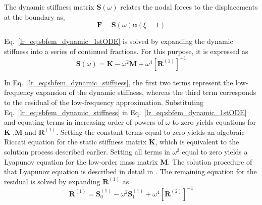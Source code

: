 The dynamic stiffness matrix $\mathbf{S}(\omega)$ relates the nodal forces to the displacements at the boundary as,
\begin{equation}
    \mathbf{F} = \mathbf{S}(\omega) \mathbf{u}(\xi=1)
    \label{lr_eq:sbfem_dynamic_nodal_force}
\end{equation}

Eq.~\ref{lr_eq:sbfem_dynamic_1stODE} is solved by expanding the dynamic stiffness into a series of continued fractions.
For this purpose, it is expressed as
\begin{equation}
    \mathbf{S}(\omega) = \mathbf{K} - \omega^2 \mathbf{M} + \omega^4 \left[
        \mathbf{R}^{(1)}    
    \right]^{-1}
    \label{lr_eq:sbfem_dynamic_stiffness}
\end{equation}

In Eq.~\ref{lr_eq:sbfem_dynamic_stiffness}, the first two terms represent the low-frequency expansion of the dynamic stiffness, whereas the third term corresponds to the residual of the low-frequency approximation.
Substituting Eq.~\ref{lr_eq:sbfem_dynamic_stiffness} in Eq.~\ref{lr_eq:sbfem_dynamic_1stODE} and equating terms in increasing order of powers of $\omega$ to zero yields equations for $\mathbf{K}$ ,$\mathbf{M}$  and $\mathbf{R}^{(1)}$.
Setting the constant terms equal to zero yields an algebraic Riccati equation for the static stiffness matrix $\mathbf{K}$, which is equivalent to the solution process described earlier.
Setting all terms in $\omega^2$ equal to zero yields a Lyapunov equation for the low-order mass matrix $\mathbf{M}$.
The solution procedure of that Lyapunov equation is described in detail in \cite{Son1997}.
The remaining equation for the residual is solved by expanding  $\mathbf{R}^{(1)}$ as
\begin{equation}
    \mathbf{R}^{(1)} = \mathbf{S}_0^{(1)} - \omega^2 \mathbf{S}_1^{(1)} + \omega^4 [\mathbf{R}^{(2)}]^{-1}
    \label{lr_eq:sbfem_dynamic_R}
\end{equation}

